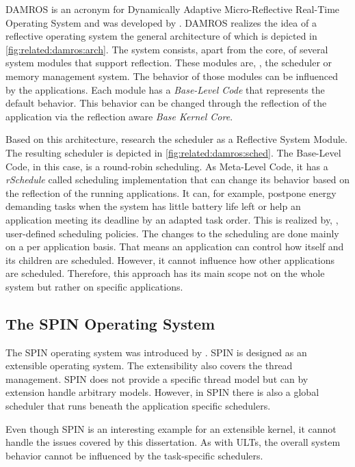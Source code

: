 DAMROS is an acronym for Dynamically Adaptive Micro-Reflective Real-Time Operating System and was developed by \textcite{Patil-2005-DAMROS}. DAMROS realizes the idea of a reflective operating system the general architecture of which is depicted in \cref{fig:related:damros:arch}. The system consists, apart from the core, of several system modules that support reflection. These modules are, \eg, the scheduler or memory management system. The behavior of those modules can be influenced by the applications. Each module has a \emph{Base-Level Code} that represents the default behavior. This behavior can be changed through the reflection of the application via the reflection aware \emph{Base Kernel Core}.

Based on this architecture, \citeauthor{Patil-2005-DAMROS} research the scheduler as a Reflective System Module. The resulting scheduler is depicted in \cref{fig:related:damros:sched}. The Base-Level Code, in this case, is a round-robin scheduling. As Meta-Level Code, it has a \emph{rSchedule} called scheduling implementation that can change its behavior based on the reflection of the running applications. It can, for example, postpone energy demanding tasks when the system has little battery life left or help an application meeting its deadline by an adapted task order. This is realized by, \eg, user-defined scheduling policies. The changes to the scheduling are done mainly on a per application basis. That means an application can control how itself and its children are scheduled. However, it cannot influence how other applications are scheduled. Therefore, this approach has its main scope not on the whole system but rather on specific applications.

\subsection{The SPIN Operating System}

The SPIN operating system was introduced by \textcite{Bershad-1995-SPIN}. SPIN is designed as an extensible operating system. The extensibility also covers the thread management. SPIN does not provide a specific thread model but can by extension handle arbitrary models.  However, in SPIN there is also a global scheduler that runs beneath the application specific schedulers.

Even though SPIN is an interesting example for an extensible kernel, it cannot handle the issues covered by this dissertation. As with \acp{ULT}, the overall system behavior cannot be influenced by the task-specific schedulers.

